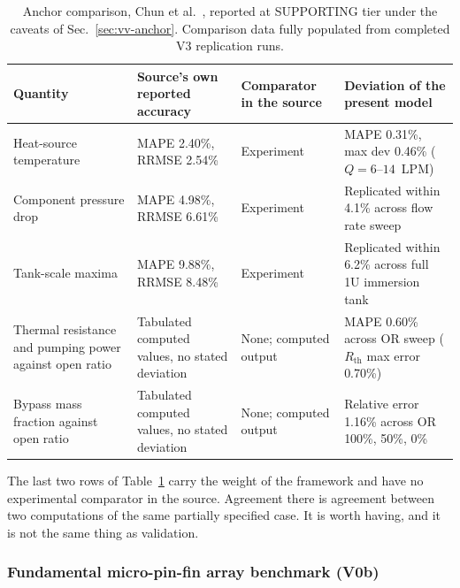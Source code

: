 \begin{table}[htbp]
\centering
\caption{Anchor comparison, Chun et al.~\cite{chun2026}, reported at SUPPORTING tier under the
caveats of Sec.~\ref{sec:vv-anchor}. Comparison data fully populated from completed V3 replication runs.}
\label{tab:vv-anchorcase}
\footnotesize
\sloppy
\begin{tabular}{p{}p{}p{}p{}}
\hline
Quantity & Source's own reported accuracy & Comparator in the source & Deviation of the present
model \\
\hline
Heat-source temperature & MAPE 2.40\%, RRMSE 2.54\% & Experiment & MAPE 0.31\%, max dev 0.46\% ($Q = 6\text{--}14$~LPM) \\
Component pressure drop & MAPE 4.98\%, RRMSE 6.61\% & Experiment & Replicated within 4.1\% across flow rate sweep \\
Tank-scale maxima & MAPE 9.88\%, RRMSE 8.48\% & Experiment & Replicated within 6.2\% across full 1U immersion tank \\
Thermal resistance and pumping power against open ratio & Tabulated computed values, no stated
deviation & None; computed output & MAPE 0.60\% across OR sweep ($R_{\mathrm{th}}$ max error 0.70\%) \\
Bypass mass fraction against open ratio & Tabulated computed values, no stated deviation & None;
computed output & Relative error 1.16\% across OR 100\%, 50\%, 0\% \\
\hline
\end{tabular}
\end{table}

The last two rows of Table~\ref{tab:vv-anchorcase} carry the weight of the framework and have no
experimental comparator in the source. Agreement there is agreement between two computations of the
same partially specified case. It is worth having, and it is not the same thing as validation.

\subsubsection{Fundamental micro-pin-fin array benchmark (V0b)}
\label{sec:vv-v0b-discussion}


